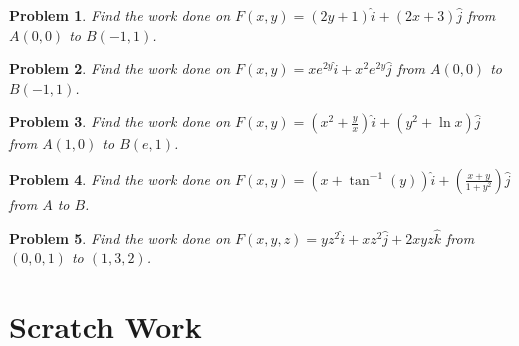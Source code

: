\documentclass[11pt]{article}
\newtheorem{problem}{Problem}
\begin{document}
\begin{problem}
    Find the work done on $F(x,y) = (2y+1)\hat{i} + (2x+3) \hat{j}$ from $A(0,0)$ to $B(-1,1)$.
\end{problem}

\vspace{9.5cm}

\begin{problem}
    Find the work done on $F(x,y) = xe^{2y}\hat{i} + x^2e^{2y} \hat{j}$ from $A(0,0)$ to $B(-1,1)$.
\end{problem}


\vspace{9.5cm}


\begin{problem}
        Find the work done on $F(x,y) = (x^2+\frac{y}{x})\hat{i} + (y^2+\ln{x}) \hat{j}$ from $A(1,0)$ to $B(e,1)$.
\end{problem}

\vspace{9.5 cm}


\begin{problem}
    Find the work done on $F(x,y) = (x+\tan^{-1}(y))\hat{i} + \left(\frac{x+y}{1+y^2}\right) \hat{j}$ from $A$ to $B$.
\end{problem}

\vspace{9.5 cm}


\begin{problem}
    Find the work done on $F(x,y,z) = yz^2 \hat{i} + xz^2 \hat{j}+ 2xyz \hat{k}$ from $(0,0,1)$ to $(1,3,2)$.
\end{problem}

\newpage

\section{Scratch Work}
\end{document}
